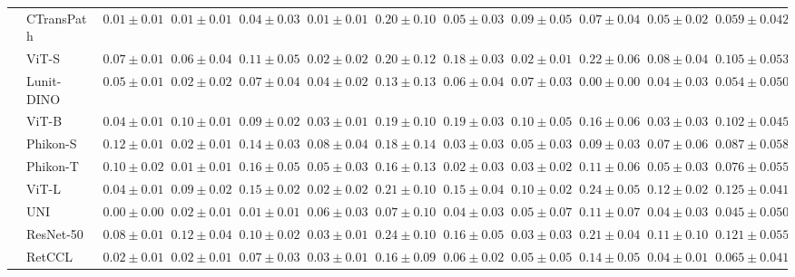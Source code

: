 \begin{tabular}{ll|cccc|c|cccc|c}
 & CTransPath~\cite{wang2022transformer} & $0.01 \pm 0.01$ & $0.01 \pm 0.01$ & $0.04 \pm 0.03$ & $\mathbf{0.01 \pm 0.01}$ & $0.20 \pm 0.10$ & $0.05 \pm 0.03$ & $0.09 \pm 0.05$ & $0.07 \pm 0.04$ & $0.05 \pm 0.02$ & $0.059 \pm 0.042$ \\
 & ViT-S~\cite{kolesnikov2021image} & $0.07 \pm 0.01$ & $0.06 \pm 0.04$ & $0.11 \pm 0.05$ & $0.02 \pm 0.02$ & $0.20 \pm 0.12$ & $0.18 \pm 0.03$ & $\mathbf{0.02 \pm 0.01}$ & $0.22 \pm 0.06$ & $0.08 \pm 0.04$ & $0.105 \pm 0.053$ \\
 & Lunit-DINO~\cite{kang2023benchmarking} & $0.05 \pm 0.01$ & $0.02 \pm 0.02$ & $0.07 \pm 0.04$ & $0.04 \pm 0.02$ & $0.13 \pm 0.13$ & $0.06 \pm 0.04$ & $0.07 \pm 0.03$ & $\mathbf{0.00 \pm 0.00}$ & $0.04 \pm 0.03$ & $0.054 \pm 0.050$ \\
 & ViT-B~\cite{kolesnikov2021image} & $0.04 \pm 0.01$ & $0.10 \pm 0.01$ & $0.09 \pm 0.02$ & $0.03 \pm 0.01$ & $0.19 \pm 0.10$ & $0.19 \pm 0.03$ & $0.10 \pm 0.05$ & $0.16 \pm 0.06$ & $0.03 \pm 0.03$ & $0.102 \pm 0.045$ \\
 & Phikon-S~\cite{filiot2023scaling} & $0.12 \pm 0.01$ & $0.02 \pm 0.01$ & $0.14 \pm 0.03$ & $0.08 \pm 0.04$ & $0.18 \pm 0.14$ & $0.03 \pm 0.03$ & $0.05 \pm 0.03$ & $0.09 \pm 0.03$ & $0.07 \pm 0.06$ & $0.087 \pm 0.058$ \\
 & Phikon-T~\cite{filiot2023scaling} & $0.10 \pm 0.02$ & $\mathbf{0.01 \pm 0.01}$ & $0.16 \pm 0.05$ & $0.05 \pm 0.03$ & $0.16 \pm 0.13$ & $\mathbf{0.02 \pm 0.03}$ & $0.03 \pm 0.02$ & $0.11 \pm 0.06$ & $0.05 \pm 0.03$ & $0.076 \pm 0.055$ \\
 & ViT-L~\cite{kolesnikov2021image} & $0.04 \pm 0.01$ & $0.09 \pm 0.02$ & $0.15 \pm 0.02$ & $0.02 \pm 0.02$ & $0.21 \pm 0.10$ & $0.15 \pm 0.04$ & $0.10 \pm 0.02$ & $0.24 \pm 0.05$ & $0.12 \pm 0.02$ & $0.125 \pm 0.041$ \\
 & UNI~\cite{chen2024uni} & $\mathbf{0.00 \pm 0.00}$ & $0.02 \pm 0.01$ & $\mathbf{0.01 \pm 0.01}$ & $0.06 \pm 0.03$ & $\mathbf{0.07 \pm 0.10}$ & $0.04 \pm 0.03$ & $0.05 \pm 0.07$ & $0.11 \pm 0.07$ & $0.04 \pm 0.03$ & $\mathbf{0.045 \pm 0.050}$ \\
 & ResNet-50~\cite{he2015deep} & $0.08 \pm 0.01$ & $0.12 \pm 0.04$ & $0.10 \pm 0.02$ & $0.03 \pm 0.01$ & $0.24 \pm 0.10$ & $0.16 \pm 0.05$ & $0.03 \pm 0.03$ & $0.21 \pm 0.04$ & $0.11 \pm 0.10$ & $0.121 \pm 0.055$ \\
 & RetCCL~\cite{wang2023retccl} & $0.02 \pm 0.01$ & $0.02 \pm 0.01$ & $0.07 \pm 0.03$ & $0.03 \pm 0.01$ & $0.16 \pm 0.09$ & $0.06 \pm 0.02$ & $0.05 \pm 0.05$ & $0.14 \pm 0.05$ & $0.04 \pm 0.01$ & $0.065 \pm 0.041$ \\

\end{tabular}
